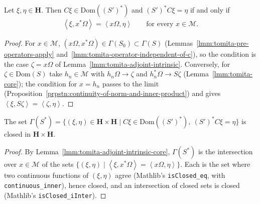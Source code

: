 \begin{lemma}
    \label{lmm:tomita-adjoint-intrinsic-core}
    \leanok
    Let $\xi, \eta \in \mathbf{H}$. Then $C\xi \in \text{Dom}((S')^*)$ and $(S')^*C\xi = \eta$ if and only if
    \begin{align}
        \left< \xi, x^*\Omega \right> = \left< x\Omega, \eta \right> \qquad \text{for every } x \in \mathcal{M}.
    \end{align}
\end{lemma}
\begin{proof}
    \leanok
    For $x \in \mathcal{M}$, $(x\Omega, x^*\Omega) \in \Gamma(S_0) \subset \Gamma(S)$ (Lemmas~\ref{lmm:tomita-pre-operators-apply} and~\ref{lmm:tomita-operator-independent-of-c}), so the condition is the case $\zeta = x\Omega$ of Lemma~\ref{lmm:tomita-adjoint-intrinsic}. Conversely, for $\zeta \in \text{Dom}(S)$ take $h_n \in \mathcal{M}$ with $h_n\Omega \to \zeta$ and $h_n^*\Omega \to S\zeta$ (Lemma~\ref{lmm:tomita-core}); the condition for $x = h_n$ passes to the limit (Proposition~\ref{prpstn:continuity-of-norm-and-inner-product}) and gives $\left< \xi, S\zeta \right> = \left< \zeta, \eta \right>$.
\end{proof}

\begin{lemma}
    \label{lmm:tomita-adjoint-graph-closed}
    \leanok
    The set $\Gamma(S^*) = \{ (\xi, \eta) \in \mathbf{H} \times \mathbf{H} \mid C\xi \in \text{Dom}((S')^*),\ (S')^*C\xi = \eta \}$ is closed in $\mathbf{H} \times \mathbf{H}$.
\end{lemma}
\begin{proof}
    \leanok
    By Lemma~\ref{lmm:tomita-adjoint-intrinsic-core}, $\Gamma(S^*)$ is the intersection over $x \in \mathcal{M}$ of the sets $\{ (\xi, \eta) \mid \left< \xi, x^*\Omega \right> = \left< x\Omega, \eta \right> \}$. Each is the set where two continuous functions of $(\xi, \eta)$ agree (Mathlib's \texttt{isClosed\_eq}, with \texttt{continuous\_inner}), hence closed, and an intersection of closed sets is closed (Mathlib's \texttt{isClosed\_iInter}).
\end{proof}


